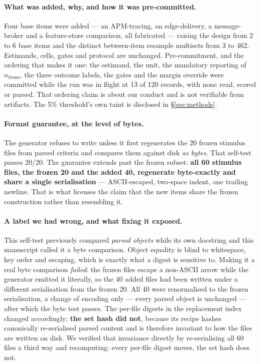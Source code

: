 \documentclass{article}
\begin{document}
\paragraph{What was added, why, and how it was pre-committed.} Four base items were added --- an APM-tracing, an
  edge-delivery, a message-broker and a feature-store comparison, all fabricated
  --- raising the design from 2 to 6 base items and the distinct between-item
  resample multisets from 3 to 462. Estimands, cells, gates and protocol are
  unchanged. Pre-commitment, and the ordering that makes it one: the estimand, the
  unit, the mandatory reporting of $n_{\text{items}}$, the three outcome labels,
  the gates and the margin override were committed while the run was in flight
  at 13 of 120 records, with none read, scored or parsed. That ordering claim is
  about our conduct and is not verifiable from artifacts. The 5\% threshold's
  own taint is disclosed in \S\ref{sec:methods}.

\paragraph{Format guarantee, at the level of bytes.} The generator refuses to
  write unless it first regenerates the 20 frozen stimulus files from parsed
  criteria and compares them against disk \emph{as bytes}. That self-test passes
  20/20. The guarantee extends past the frozen subset: \textbf{all 60 stimulus
  files, the frozen 20 and the added 40, regenerate byte-exactly and share a
  single serialisation} --- ASCII-escaped, two-space indent, one trailing
  newline. That is what licenses the claim that the new items share the frozen
  construction rather than resembling it.

\paragraph{A label we had wrong, and what fixing it exposed.} This self-test
  previously compared \emph{parsed objects} while its own docstring and this
  manuscript called it a byte comparison. Object equality is blind to
  whitespace, key order and escaping, which is exactly what a digest is
  sensitive to. Making it a real byte comparison \emph{failed}: the frozen files
  escape a non-ASCII arrow while the generator emitted it literally, so the 40
  added files had been written under a different serialisation from the frozen
  20. All 40 were renormalised to the frozen serialisation, a change of
  encoding only --- every parsed object is unchanged --- after which the byte
  test passes. The per-file digests in the replacement index changed
  accordingly; \textbf{the set hash did not}, because its recipe hashes
  canonically re-serialised parsed content and is therefore invariant to how the
  files are written on disk. We verified that invariance directly by
  re-serialising all 60 files a third way and recomputing: every per-file digest
  moves, the set hash does not.
\end{document}
